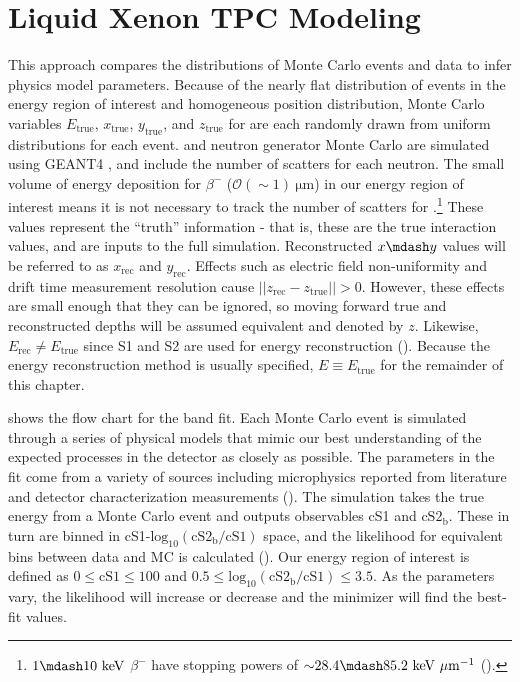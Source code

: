 \section{Liquid Xenon TPC Modeling}
\label{sec:er_nr_calibrations_parameter_determ}
This approach compares the distributions of Monte Carlo events and data to infer physics model parameters.  Because of the nearly flat
distribution of events in the energy
region of interest and homogeneous position distribution, Monte Carlo variables $E_{\mathrm{true}}$, $x_{\mathrm{true}}$,
$y_{\mathrm{true}}$, and $z_{\mathrm{true}}$ for  are each randomly drawn from uniform distributions for each
event.   and
neutron generator Monte Carlo are simulated using GEANT4 , and include the number of
scatters for each neutron.  The small volume of energy deposition for $\beta^-$ ($\mathcal{O}({\sim}1)\ \mathrm{\mu m}$) in
our energy region of interest means it is not necessary to track the number of scatters for
.\footnote{$1 \mdash 10\ \mathrm{keV}$ $\beta^-$ have stopping powers of ${\sim}28.4 \mdash 85.2\ \mathrm{keV\ \mu m^{-1}}$
().}  These
values represent the ``truth'' information - that is, these are the true interaction values, and are inputs to the full
simulation.  Reconstructed $x \mdash y$ values will be referred to as $x_{\mathrm{rec}}$
and $y_{\mathrm{rec}}$.  Effects such as electric field non-uniformity and drift time measurement resolution cause
$||z_{\mathrm{rec}} - z_{\mathrm{true}}|| > 0$.  However, these effects are small enough that they can be ignored, so moving forward
true and reconstructed depths will be assumed equivalent and denoted by $z$.  Likewise,
$E_{\mathrm{rec}} \neq E_{\mathrm{true}}$ since S1 and S2 are used for energy reconstruction
().  Because the energy reconstruction method is usually specified, $E \equiv E_{\mathrm{true}}$ for
the remainder of this chapter.

 shows the flow chart for the band fit.  Each Monte Carlo event is
simulated through a series of physical models that mimic our best understanding of the expected processes in the detector as closely as
possible.  The parameters in the fit come from
a variety of sources including microphysics reported from literature and detector characterization measurements
().  The simulation takes the true energy from a Monte Carlo event and outputs observables cS1 and
$\mathrm{cS2_b}$.  These in turn are binned in cS1-$\mathrm{log_{10}(cS2_b / cS1)}$ space, and the likelihood for equivalent bins
between data and MC is calculated ().  Our energy region of interest is
defined as $0 \leq \mathrm{cS1} \leq 100$ and $0.5 \leq \mathrm{log_{10}(cS2_b / cS1)} \leq 3.5$.  As the parameters vary, the likelihood
will increase or decrease and the minimizer will find the best-fit values.

